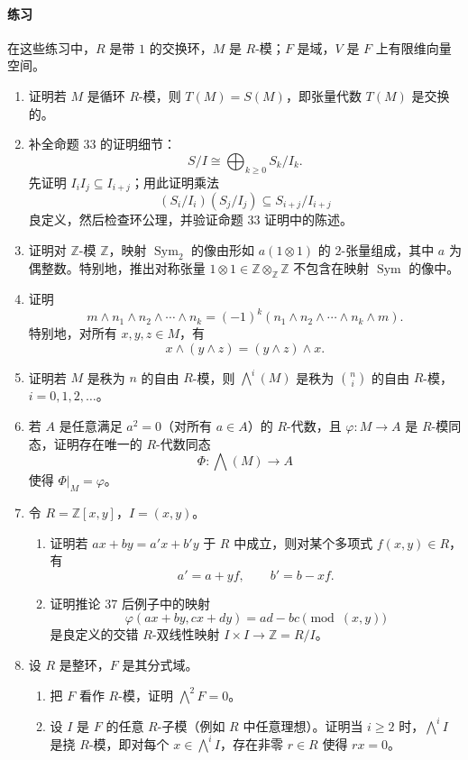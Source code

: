 \paragraph{练习}
在这些练习中，$R$ 是带 $1$ 的交换环，$M$ 是 $R$-模；$F$ 是域，$V$ 是 $F$ 上有限维向量空间。
\begin{enumerate}[label=\arabic*.]
\item 证明若 $M$ 是循环 $R$-模，则 $T(M)=S(M)$，即张量代数 $T(M)$ 是交换的。
\item 补全命题 33 的证明细节：
\[
S/I\cong\bigoplus_{k\geq0}S_k/I_k.
\]
先证明 $I_iI_j\subseteq I_{i+j}$；用此证明乘法
\[
(S_i/I_i)(S_j/I_j)\subseteq S_{i+j}/I_{i+j}
\]
良定义，然后检查环公理，并验证命题 33 证明中的陈述。
\item 证明对 $\mathbb Z$-模 $\mathbb Z$，映射 $\operatorname{Sym}_2$ 的像由形如 $a(1\otimes1)$ 的 $2$-张量组成，其中 $a$ 为偶整数。特别地，推出对称张量 $1\otimes1\in\mathbb Z\otimes_{\mathbb Z}\mathbb Z$ 不包含在映射 $\operatorname{Sym}$ 的像中。
\item 证明
\[
m\wedge n_1\wedge n_2\wedge\cdots\wedge n_k
=(-1)^k(n_1\wedge n_2\wedge\cdots\wedge n_k\wedge m).
\]
特别地，对所有 $x,y,z\in M$，有
\[
x\wedge(y\wedge z)=(y\wedge z)\wedge x.
\]
\item 证明若 $M$ 是秩为 $n$ 的自由 $R$-模，则 $\bigwedge^i(M)$ 是秩为 $\binom ni$ 的自由 $R$-模，$i=0,1,2,\ldots$。
\item 若 $A$ 是任意满足 $a^2=0$（对所有 $a\in A$）的 $R$-代数，且 $\varphi:M\to A$ 是 $R$-模同态，证明存在唯一的 $R$-代数同态
\[
\Phi:\bigwedge(M)\to A
\]
使得 $\Phi|_M=\varphi$。
\item 令 $R=\mathbb Z[x,y]$，$I=(x,y)$。
\begin{enumerate}[label=(\alph*)]
\item 证明若 $ax+by=a'x+b'y$ 于 $R$ 中成立，则对某个多项式 $f(x,y)\in R$，有
\[
a'=a+yf,
\qquad
b'=b-xf.
\]
\item 证明推论 37 后例子中的映射
\[
\varphi(ax+by,cx+dy)=ad-bc\pmod{(x,y)}
\]
是良定义的交错 $R$-双线性映射 $I\times I\to\mathbb Z=R/I$。
\end{enumerate}
\item 设 $R$ 是整环，$F$ 是其分式域。
\begin{enumerate}[label=(\alph*)]
\item 把 $F$ 看作 $R$-模，证明 $\bigwedge^2F=0$。
\item 设 $I$ 是 $F$ 的任意 $R$-子模（例如 $R$ 中任意理想）。证明当 $i\geq2$ 时，$\bigwedge^i I$ 是挠 $R$-模，即对每个 $x\in\bigwedge^i I$，存在非零 $r\in R$ 使得 $rx=0$。

\end{enumerate}
\end{enumerate}
